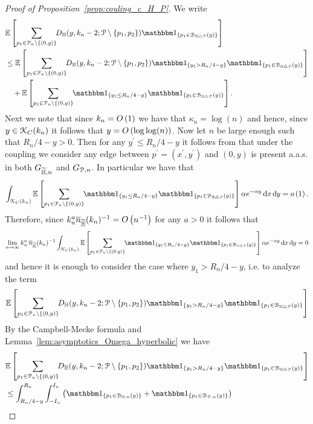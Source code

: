 \begin{proof}[Proof of Proposition~\ref{prop:couling_c_H_P}]
We write
\begin{align*}
	&\Exp{\sum_{p_1 \in \Pcal_n \setminus \{(0,y)\}} \hspace{-3pt} 
		D_{\H}(y,k_n-2;\Pcal \setminus \{p_1,p_2\}) \ind{p_1 \in \BallSym{y}}}\\
	&\le \Exp{\sum_{p_1 \in \Pcal_n \setminus \{(0,y)\}} \hspace{-3pt} 
		D_{\H}(y,k_n-2;\Pcal \setminus \{p_1,p_2\}) \ind{y_1 > R_n/4 - y} \ind{p_1 \in \BallSym{y}}}\\
	&\hspace{10pt}+ \Exp{\sum_{p_1 \in \Pcal_n \setminus \{(0,y)\}} \hspace{-3pt} 
		\ind{y_1 \le R_n/4 - y} \ind{p_1 \in \BallSym{y}}}.
\end{align*}
Next we note that since $k_n = O\left(1\right)$ we have that $\kappa_n = \log(n)$ and hence, since $y \in {\mathcal K}_C(k_n)$ it follows that $y = O\left(\log\log(n)\right)$. Now let $n$ be large enough such that $R_n/4 - y > 0$. Then for any $y^\prime \le R_n/4 - y$ it follows from \cite[Lemma 30]{fountoulakis2018law} that under the coupling we consider any edge between $p^{\prime} = (x^\prime, y^\prime)$ and $(0,y)$ is present a.a.s. in both $G_{\widetilde{\mathbb{H}},n}$ and $G_{{\mathcal P},n}$. In particular we have that
\[
	\int_{\Kcal_{C}(k_n)} \Exp{\sum_{p_1 \in \Pcal_n \setminus \{(0,y)\}} \hspace{-3pt} \ind{y_1 \le R_n/4 - y} 
		\ind{p_1 \in \BallSym{y}}} \alpha e^{-\alpha y} \dd x \dd y = \smallO{1}.
\]
Therefore, since $k_n^a \overline{n}_{\widetilde{\mathbb{H}}}(k_n)^{-1} = O\left(n^{-1}\right)$ for any $a > 0$ it follows that
\[
	\lim_{n \to \infty} k_n^a \, \expH^{-1} \int_{\Kcal_{C}(k_n)} \Exp{\sum_{p_1 \in \Pcal_n \setminus \{(0,y)\}} \hspace{-3pt} \ind{y_1 \le R_n/4 - y} \ind{p_1 \in \BallSym{y}}} \alpha e^{-\alpha y} \dd x \dd y = 0
\]
and hence it is enough to consider the case where $y_1 > R_n/4 - y$, i.e. to analyze the term
\[
	\Exp{\sum_{p_1 \in \Pcal_n \setminus \{(0,y)\}} \hspace{-3pt} 
			D_{\H}(y,k_n-2;\Pcal \setminus \{p_1,p_2\}) \ind{y_1 > R_n/4 - y} \ind{p_1 \in \BallSym{y}}}
\]
By the Campbell-Mecke formula and Lemma~\ref{lem:asymptotics_Omega_hyperbolic} we have
\begin{align*}
	&\Exp{\sum_{p_1 \in \Pcal_n \setminus \{(0,y)\}} \hspace{-3pt} 
				D_{\H}(y,k_n-2;\Pcal \setminus \{p_1,p_2\}) \ind{y_1 > R_n/4 - y} \ind{p_1 \in \BallSym{y}}}\\
	&\le \int_{R_n/4 - y}^{R_n} \int_{-I_n}^{I_n} \left(\ind{p_1 \in \BallHyp{y}} + \ind{p_1 \in \BallPon{y}}\right)

\end{align*}
\end{proof}

